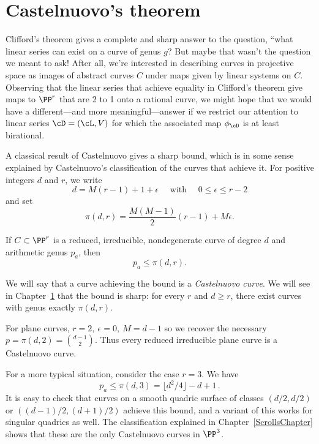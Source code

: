 \section{Castelnuovo's theorem}

Clifford's theorem gives a complete and sharp answer to the question, ``what linear series can exist on a curve of genus $g$?
But maybe that wasn't the question we meant to ask! After all, we're interested in describing curves in projective space as images of abstract curves $C$ under maps given by linear systems on $C$. Observing that the linear series that achieve equality in Clifford's theorem give maps to $\PP^r$ that are 2 to 1 onto a rational curve, we might hope that we would have a different---and more meaningful---answer if we  restrict our attention to linear series $\cD = (\cL,V)$ for which the associated map $\phi_\cD$ is at least  birational. 

A classical result of Castelnuovo gives a sharp bound, which is in some sense explained by Castelnuovo's classification of the curves that achieve it. For positive integers $d$ and $r$, we write
$$
 d = M(r-1) + 1 + \epsilon \quad \text{ with } \quad 0 \leq \epsilon \leq r-2
$$
and set
$$
\pi(d,r) = \frac{M(M-1)}{2}(r-1) + M\epsilon.
$$

\begin{theorem}\label{Castelnuovo's bound}
If $C \subset \PP^r$ is a reduced, irreducible, nondegenerate curve of degree $d$ and arithmetic genus $p_a$, then
$$
p_a \leq \pi(d,r).
$$
\end{theorem}

We will say that a curve achieving the bound is a \emph{Castelnuovo curve}. We will see in Chapter~\ref{} that the bound is sharp: for every $r$ and $d \geq r$, there exist curves with genus exactly $\pi(d,r)$. 

\begin{example}
For plane curves, $r=2, \ \epsilon = 0, \ M = d-1$ so we recover the necessary $p = \pi(d,2) =  {d-1\choose 2}$. Thus every reduced irreducible
plane curve is a Castelnuovo curve.
\end{example}

\begin{example}For a more typical situation, consider the case $r=3$. We have
$$
p_a \leq \pi(d,3) = \lfloor d^2/4 \rfloor-d+1\, .
$$
It is easy to check that curves on a smooth quadric surface of classes
$(d/2, d/2)$ or $((d-1)/2, (d+1)/2)$
achieve this bound, and a variant of this works for singular quadrics as well. The classification  explained in Chapter~\ref{ScrollsChapter}
shows that these are the only Castelnuovo curves in $\PP^3$.
\end{example}

